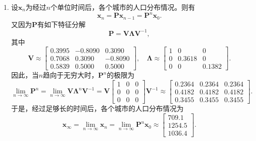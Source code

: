 \begin{solution}
\begin{enumerate}
        \item 设\( \bm{x}_n \)为经过\( n \)个单位时间后，各个城市的人口分布情况。则有
              \[
                  \bm{x}_n = \mathbf{P} \bm{x}_{n-1} = \mathbf{P}^n \bm{x}_0.
              \]
              又因为\( \mathbf{P} \)有如下特征分解
              \[
                  \mathbf{P} = \mathbf{V} \mathbf{\Lambda} \mathbf{V}^{-1},
              \]
              其中
              \[
                  \mathbf{V} \approx
                  \begin{bmatrix}
                      0.3995 & -0.8090 & 0.3090  \\
                      0.7068 & 0.3090  & -0.8090 \\
                      0.5839 & 0.5000  & 0.5000
                  \end{bmatrix}, \quad \mathbf{\Lambda} \approx
                  \begin{bmatrix}
                      1 & 0      & 0      \\
                      0 & 0.3618 & 0      \\
                      0 & 0      & 0.1382
                  \end{bmatrix}.
              \]
              因此，当\( n \)趋向于无穷大时，\( \mathbf{P}^n \)的极限为
              \[
                  \lim_{n \to \infty} \mathbf{P}^n = \lim_{n \to \infty} \mathbf{V} \mathbf{\Lambda}^n \mathbf{V}^{-1} = \mathbf{V}
                  \begin{bmatrix}
                      1 & 0 & 0 \\
                      0 & 0 & 0 \\
                      0 & 0 & 0
                  \end{bmatrix} \mathbf{V}^{-1} \approx
                  \begin{bmatrix}
                      0.2364 & 0.2364 & 0.2364 \\
                      0.4182 & 0.4182 & 0.4182 \\
                      0.3455 & 0.3455 & 0.3455
                  \end{bmatrix}.
              \]
              于是，经过足够长的时间后，各个城市的人口分布情况为
              \[
                  \bm{x}_\infty = \lim_{n \to \infty} \bm{x}_n = \lim_{n \to \infty} \mathbf{P}^n \bm{x}_0 \approx
                  \begin{bmatrix}
                      709.1  \\
                      1254.5 \\
                      1036.4
                  \end{bmatrix}.
              \]

    \end{enumerate}
\end{solution}

